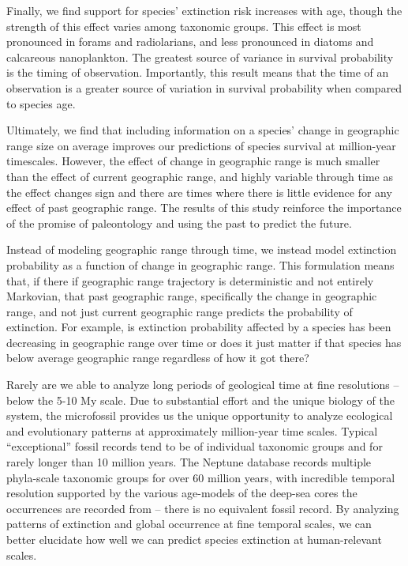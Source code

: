 \documentclass[12pt,letterpaper]{article}
\begin{document}
Finally, we find support for species' extinction risk increases with age, though the strength of this effect varies among taxonomic groups. This effect is most pronounced in forams and radiolarians, and less pronounced in diatoms and calcareous nanoplankton. The greatest source of variance in survival probability is the timing of observation. Importantly, this result means that the time of an observation is a greater source of variation in survival probability when compared to species age. 

Ultimately, we find that including information on a species' change in geographic range size on average improves our predictions of species survival at million-year timescales. However, the effect of change in geographic range is much smaller than the effect of current geographic range, and highly variable through time as the effect changes sign and there are times where there is little evidence for any effect of past geographic range. The results of this study reinforce the importance of the promise of paleontology and using the past to predict the future.



Instead of modeling geographic range through time, we instead model extinction probability as a function of change in geographic range. This formulation means that, if there if geographic range trajectory is deterministic and not entirely Markovian, that past geographic range, specifically the change in geographic range, and not just current geographic range predicts the probability of extinction. For example, is extinction probability affected by a species has been decreasing in geographic range over time or does it just matter if that species has below average geographic range regardless of how it got there?


Rarely are we able to analyze long periods of geological time at fine resolutions -- below the 5-10 My scale. Due to substantial effort and the unique biology of the system, the microfossil provides us the unique opportunity to analyze ecological and evolutionary patterns at approximately million-year time scales. Typical ``exceptional'' fossil records tend to be of individual taxonomic groups and for rarely longer than 10 million years. The Neptune database records multiple phyla-scale taxonomic groups for over 60 million years, with incredible temporal resolution supported by the various age-models of the deep-sea cores the occurrences are recorded from -- there is no equivalent fossil record. By analyzing patterns of extinction and global occurrence at fine temporal scales, we can better elucidate how well we can predict species extinction at human-relevant scales.
\end{document}
